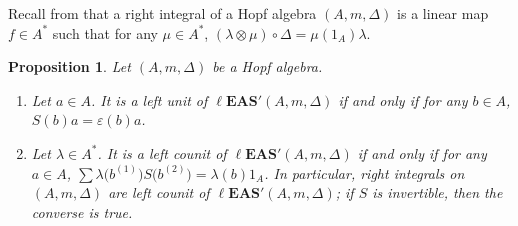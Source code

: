 \documentclass[10pt,a4paper]{amsart}
\numberwithin{equation}{section}
\newtheorem{Proposition}[Theorem]{Proposition}
 { \theoremstyle{definition}
\newtheorem{Definition}[Theorem]{Definition}
\newtheorem{Note}[Theorem]{Note}
\newtheorem{Example}[Theorem]{Example}
\newtheorem{Remark}[Theorem]{Remark}
\newtheorem{Notation}[Theorem]{Notation}}
\newcommand{\leas}{\ell\mathbf{EAS}}
\begin{document}
Recall from \cite{Sweedler1969-2} that a right integral of a Hopf algebra $(A,m,\Delta)$ is a linear map $f\in A^*$ such that for any $\mu\in A^*$,
$(\lambda \otimes \mu)\circ \Delta=\mu(1_A) \lambda$.

\begin{Proposition} \label{prop5.11}
Let $(A,m,\Delta)$ be a Hopf algebra.
\begin{enumerate}\itemsep=0pt
\item[$(1)$] Let $a\in A$. It is a left unit of $\leas'(A,m,\Delta)$ if and only if for any $b\in A$, $S(b)a=\varepsilon(b)a$.
\item[$(2)$] Let $\lambda \in A^*$. It is a left counit of $\leas'(A,m,\Delta)$ if and only if for any $a\in A$, \linebreak $\sum \lambda\bigl(b^{(1)}\bigr) S\bigl(b^{(2)}\bigr)=\lambda(b)1_A$.
In particular, right integrals on $(A,m,\Delta)$ are left counit of $\leas'(A,m,\Delta)$; if $S$ is invertible, then the converse is true.
\end{enumerate}\end{Proposition}
\end{document}
